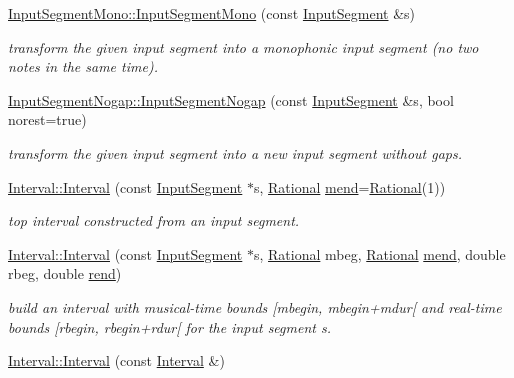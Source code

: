 \begin{DoxyCompactItemize}
\mbox{\hyperlink{group__segment_gad033d12a18d0f8cd7a8b0a2f5f029db2}{Input\+Segment\+Mono\+::\+Input\+Segment\+Mono}} (const \mbox{\hyperlink{classInputSegment}{Input\+Segment}} \&s)
\begin{DoxyCompactList}\small\item\em transform the given input segment into a monophonic input segment (no two notes in the same time). \end{DoxyCompactList}\item 
\mbox{\hyperlink{group__segment_gaa05ab07eeaf10f35e57552ab045ac548}{Input\+Segment\+Nogap\+::\+Input\+Segment\+Nogap}} (const \mbox{\hyperlink{classInputSegment}{Input\+Segment}} \&s, bool norest=true)
\begin{DoxyCompactList}\small\item\em transform the given input segment into a new input segment without gaps. \end{DoxyCompactList}\item 
\mbox{\hyperlink{group__segment_gadfaf31fca3f5e5da49e37c7baa275125}{Interval\+::\+Interval}} (const \mbox{\hyperlink{classInputSegment}{Input\+Segment}} $\ast$s, \mbox{\hyperlink{classRational}{Rational}} \mbox{\hyperlink{classInterval_a963b9b36f085a7db9c159c55608f8408}{mend}}=\mbox{\hyperlink{classRational}{Rational}}(1))
\begin{DoxyCompactList}\small\item\em top interval constructed from an input segment. \end{DoxyCompactList}\item 
\mbox{\hyperlink{group__segment_gaefc21b7c838661c05286304f6d891690}{Interval\+::\+Interval}} (const \mbox{\hyperlink{classInputSegment}{Input\+Segment}} $\ast$s, \mbox{\hyperlink{classRational}{Rational}} mbeg, \mbox{\hyperlink{classRational}{Rational}} \mbox{\hyperlink{classInterval_a963b9b36f085a7db9c159c55608f8408}{mend}}, double rbeg, double \mbox{\hyperlink{classInterval_a1acb3128311a318b23e68cc8ca0182e9}{rend}})
\begin{DoxyCompactList}\small\item\em build an interval with musical-\/time bounds \mbox{[}mbegin, mbegin+mdur\mbox{[} and real-\/time bounds \mbox{[}rbegin, rbegin+rdur\mbox{[} for the input segment s. \end{DoxyCompactList}\item 
\mbox{\label{group__segment_ga17cfcca410ae94fe906dfcdb726026f5}} 
\mbox{\hyperlink{group__segment_ga17cfcca410ae94fe906dfcdb726026f5}{Interval\+::\+Interval}} (const \mbox{\hyperlink{classInterval}{Interval}} \&)

\end{DoxyCompactItemize}
